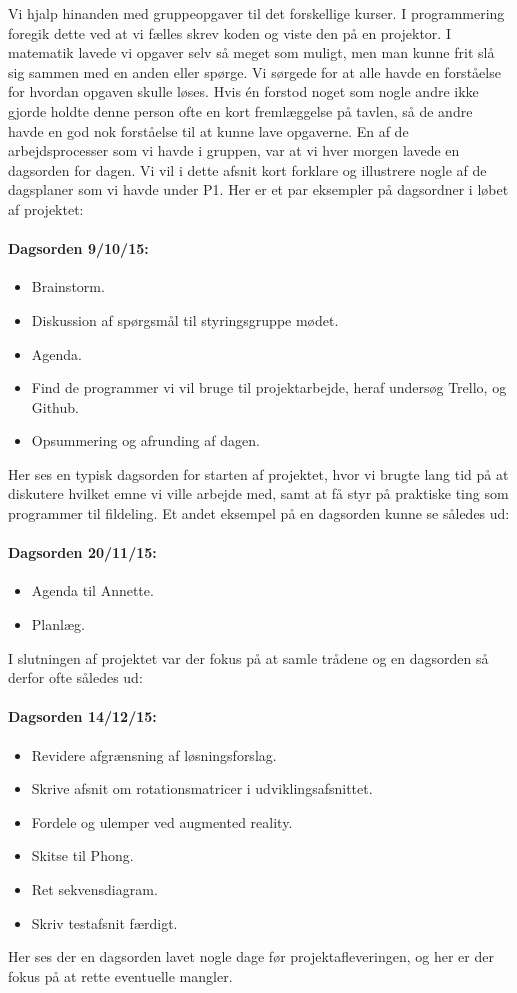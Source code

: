 \documentclass[oneside,a4paper,titlepage]{article}
\begin{document}
Vi hjalp hinanden med gruppeopgaver til det forskellige kurser. I programmering foregik dette ved at vi fælles skrev koden og viste den på en projektor. I matematik lavede vi opgaver selv så meget som muligt, men man kunne frit slå sig sammen med en anden eller spørge. Vi sørgede for at alle havde en forståelse for hvordan opgaven skulle løses. Hvis én forstod noget som nogle andre ikke gjorde holdte denne person ofte en kort fremlæggelse på tavlen, så de andre havde en god nok forståelse til at kunne lave opgaverne. \newline\newline
En af de arbejdsprocesser som vi havde i gruppen, var at vi hver morgen lavede en dagsorden for dagen. Vi vil i dette afsnit kort forklare og illustrere nogle af de dagsplaner som vi havde under P1. 
Her er et par eksempler på dagsordner i løbet af projektet:
\paragraph{Dagsorden 9/10/15:}
\begin{itemize}
  \item Brainstorm.
  \item Diskussion af spørgsmål til styringsgruppe mødet.
  \item Agenda.
  \item Find de programmer vi vil bruge til projektarbejde, heraf undersøg Trello, og Github.
  \item Opsummering og afrunding  af dagen.
\end{itemize}
Her ses en typisk dagsorden for starten af projektet, hvor vi brugte lang tid på at diskutere hvilket emne vi ville arbejde med, samt at få styr på praktiske ting som programmer til fildeling.
Et andet eksempel på en dagsorden kunne se således ud:
\paragraph{Dagsorden 20/11/15:}
\begin{itemize}
  \item Agenda til Annette.
  \item Planlæg.
\end{itemize}
I slutningen af projektet var der fokus på at samle trådene og en dagsorden så derfor ofte således ud:

\paragraph{Dagsorden 14/12/15:}
\begin{itemize}
  \item Revidere afgrænsning af løsningsforslag.
  \item Skrive afsnit om rotationsmatricer i udviklingsafsnittet.
  \item Fordele og ulemper ved augmented reality.
  \item Skitse til Phong.
  \item Ret sekvensdiagram.
  \item Skriv testafsnit færdigt.
\end{itemize}
Her ses der en dagsorden lavet nogle dage før projektafleveringen, og her er der fokus på at rette eventuelle mangler.
\end{document}
